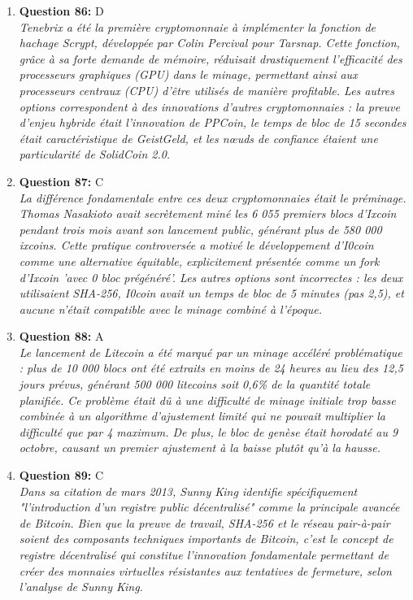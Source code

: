 \documentclass[12pt,a4paper]{article}
\begin{document}
\begin{enumerate}
\item \textbf{Question 86:} D
\\ \textit{Tenebrix a été la première cryptomonnaie à implémenter la fonction de hachage Scrypt, développée par Colin Percival pour Tarsnap. Cette fonction, grâce à sa forte demande de mémoire, réduisait drastiquement l'efficacité des processeurs graphiques (GPU) dans le minage, permettant ainsi aux processeurs centraux (CPU) d'être utilisés de manière profitable. Les autres options correspondent à des innovations d'autres cryptomonnaies : la preuve d'enjeu hybride était l'innovation de PPCoin, le temps de bloc de 15 secondes était caractéristique de GeistGeld, et les nœuds de confiance étaient une particularité de SolidCoin 2.0.}

\item \textbf{Question 87:} C
\\ \textit{La différence fondamentale entre ces deux cryptomonnaies était le préminage. Thomas Nasakioto avait secrètement miné les 6 055 premiers blocs d'Ixcoin pendant trois mois avant son lancement public, générant plus de 580 000 ixcoins. Cette pratique controversée a motivé le développement d'I0coin comme une alternative équitable, explicitement présentée comme un fork d'Ixcoin 'avec 0 bloc prégénéré'. Les autres options sont incorrectes : les deux utilisaient SHA-256, I0coin avait un temps de bloc de 5 minutes (pas 2,5), et aucune n'était compatible avec le minage combiné à l'époque.}

\item \textbf{Question 88:} A
\\ \textit{Le lancement de Litecoin a été marqué par un minage accéléré problématique : plus de 10 000 blocs ont été extraits en moins de 24 heures au lieu des 12,5 jours prévus, générant 500 000 litecoins soit 0,6\% de la quantité totale planifiée. Ce problème était dû à une difficulté de minage initiale trop basse combinée à un algorithme d'ajustement limité qui ne pouvait multiplier la difficulté que par 4 maximum. De plus, le bloc de genèse était horodaté au 9 octobre, causant un premier ajustement à la baisse plutôt qu'à la hausse.}

\item \textbf{Question 89:} C
\\ \textit{Dans sa citation de mars 2013, Sunny King identifie spécifiquement "l'introduction d'un registre public décentralisé" comme la principale avancée de Bitcoin. Bien que la preuve de travail, SHA-256 et le réseau pair-à-pair soient des composants techniques importants de Bitcoin, c'est le concept de registre décentralisé qui constitue l'innovation fondamentale permettant de créer des monnaies virtuelles résistantes aux tentatives de fermeture, selon l'analyse de Sunny King.}


\end{enumerate}
\end{document}
